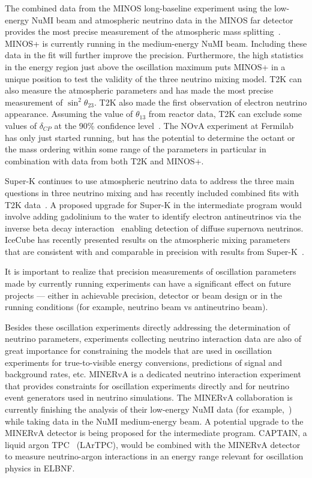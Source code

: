 The combined data from the MINOS long-baseline experiment using the
low-energy NuMI beam and atmospheric neutrino data in the MINOS far
detector provides the most precise measurement of the atmospheric mass
splitting~\cite{Adamson:2014vgd}.  MINOS+ is currently running in the
medium-energy NuMI beam.  Including these data in the fit will further
improve the precision.  Furthermore, the high statistics in the energy
region just above the oscillation maximum puts MINOS+ in a unique
position to test the validity of the three neutrino mixing model. T2K
can also measure the atmospheric parameters and has made the most
precise measurement of $\sin^2\theta_{23}$.  T2K also made the first
observation of electron neutrino appearance.  Assuming the value of
$\theta_{13}$ from reactor data, T2K can exclude some values of
$\delta_{CP}$ at the 90\% confidence level~\cite{Abe:2015awa}.  The
NOvA experiment at Fermilab has only just started running, but has the
potential to determine the octant or the mass ordering within some
range of the parameters in particular in combination with data from
both T2K and MINOS+.

Super-K continues to use atmospheric neutrino data to address
the three main questions in three neutrino mixing and has recently
included combined fits with T2K data~\cite{Wendell:2014dka}.  A
proposed upgrade for Super-K in the intermediate program would involve
adding gadolinium to the water to identify electron antineutrinos via
the inverse beta decay interaction~\cite{Beacom:2003nk} enabling
detection of diffuse supernova neutrinos. IceCube has recently
presented results on the atmospheric mixing parameters that are
consistent with and comparable in precision with results from
Super-K~\cite{Aartsen:2014yll}.

It is important to realize that precision measurements of oscillation
parameters made by currently running experiments can have a
significant effect on future projects --- either in achievable
precision, detector or beam design or in the running conditions (for
example, neutrino beam vs antineutrino beam).

Besides these oscillation experiments directly addressing the
determination of neutrino parameters, experiments collecting neutrino
interaction data are also of great importance for constraining the models
that are used in oscillation experiments for true-to-visible energy
conversions, predictions of signal and background rates, etc.  MINERvA
is a dedicated neutrino interaction experiment that provides
constraints for oscillation experiments directly and for neutrino
event generators used in neutrino simulations.  The MINERvA
collaboration is currently finishing the analysis of their low-energy
NuMI data (for example,~\cite{Walton:2014esl}) while taking data in
the NuMI medium-energy beam.  A potential upgrade to the MINERvA
detector is being proposed for the intermediate program.  CAPTAIN, a
liquid argon TPC~\cite{Berns:2013usa} (LArTPC), would be combined with the
MINERvA detector to measure neutrino-argon interactions in an energy
range relevant for oscillation physics in ELBNF.

